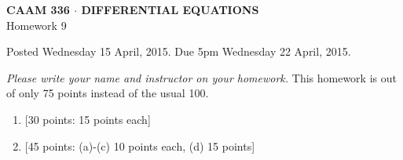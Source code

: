 \documentclass[10pt]{article}
\begin{document}
\vspace*{-5em}
\begin{center}
\large \textsf{\textbf{CAAM 336 $\cdot$ DIFFERENTIAL EQUATIONS}\\[0.5em]
Homework 9 }
\end{center}

Posted Wednesday 15 April, 2015.  Due 5pm Wednesday 22 April, 2015.
\begin{center}
\emph{Please write your name and instructor on your homework.}  This homework is out of only 75 points instead of the usual 100.
\end{center}

\begin{enumerate}

\item {[30 points: 15 points each]}\\

\newpage
\item {[45 points: (a)-(c) 10 points each, (d) 15 points]}\\


\end{enumerate}
\end{document}
